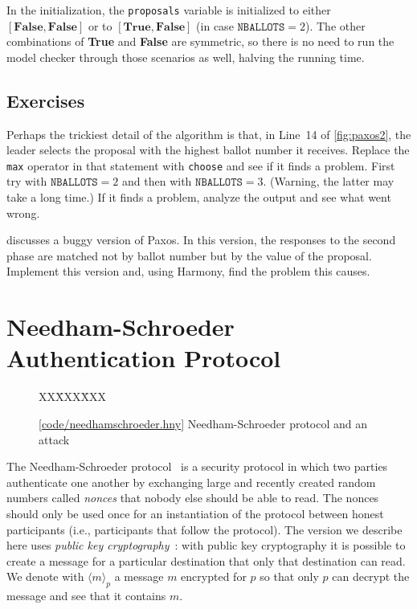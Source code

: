\documentclass{report}
\newcommand{\harmonysource}[1]{
\begin{tabbing}
XX\=XXX\=XXX\kill
    
\end{tabbing}
}
\newcommand{\harmonylink}[1]{%
[\href{https://harmony.cs.cornell.edu/#1}{\underline{#1}}]%
}
\newenvironment{code}{
\tcolorbox
}{
\endtcolorbox
}
\begin{document}
In the initialization, the \texttt{proposals} variable is initialized
to either $[\mathbf{False}, \mathbf{False}]$ or
to $[\mathbf{True}, \mathbf{False}]$ (in case $\texttt{NBALLOTS} = 2$).
The other combinations of \textbf{True} and \textbf{False} are symmetric,
so there is no need to run the model checker through those scenarios as
well, halving the running time.

\section*{Exercises}
\begin{problems}
\item Perhaps the trickiest detail of the algorithm is that, in Line~14
of \autoref{fig:paxos2}, the leader selects the proposal with the highest
ballot number it receives.  Replace the \texttt{max} operator in that statement
with \texttt{choose} and see if it finds a problem.  First try with
$\texttt{NBALLOTS} = 2$ and then with $\texttt{NBALLOTS} = 3$.
(Warning, the latter may take a long time.)  If it finds a problem,
analyze the output and see what went wrong.
\item \cite{MWA19} discusses a buggy version of Paxos.  In this version,
the responses to the second phase are matched not by ballot number but
by the value of the proposal.  Implement this version and, using Harmony,
find the problem this causes.
\end{problems}

\chapter{Needham-Schroeder Authentication Protocol}
\label{ch:ns}

\begin{figure}
\begin{code}
\harmonysource{needhamschroeder}
\end{code}
\caption{\harmonylink{code/needhamschroeder.hny} Needham-Schroeder protocol and an attack}
\label{fig:ns}
\end{figure}

The Needham-Schroeder protocol~\cite{NS78} is a security protocol in which two parties
authenticate one another by exchanging large and recently created random numbers
called \emph{nonces} that nobody else should be able to read.
The nonces should only be used once for an instantiation of the protocol between
honest participants (i.e., participants that follow the protocol).
The version we describe here uses \emph{public key cryptography}~\cite{DH76}: with public key
cryptography it is possible to create a message for a particular destination that
only that destination can read.  We denote with $\langle m \rangle_p$ a message
$m$ encrypted for $p$ so that only $p$ can decrypt the message and see that it contains $m$.
\end{document}

